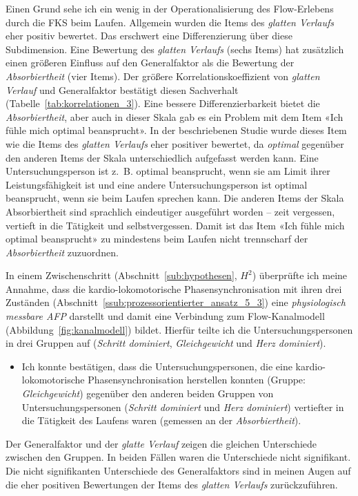 Einen Grund sehe ich ein wenig in der Operationalisierung des Flow-Erlebens durch die \ac{FKS} beim Laufen. Allgemein wurden die Items des \emph{glatten Verlaufs} eher positiv bewertet. Das erschwert eine Differenzierung über diese Subdimension. Eine Bewertung des \emph{glatten Verlaufs} (sechs Items) hat zusätzlich einen größeren Einfluss auf den Generalfaktor als die Bewertung der \emph{Absorbiertheit} (vier Items). Der größere Korrelationskoeffizient von \emph{glatten Verlauf} und Generalfaktor bestätigt diesen Sachverhalt (Tabelle~\ref{tab:korrelationen_3}). Eine bessere Differenzierbarkeit bietet die \emph{Absorbiertheit}, aber auch in dieser Skala gab es ein Problem mit dem Item «Ich fühle mich optimal beansprucht». In der beschriebenen Studie wurde dieses Item wie die Items des \emph{glatten Verlaufs} eher positiver bewertet, da \emph{optimal} gegenüber den anderen Items der Skala unterschiedlich aufgefasst werden kann. Eine Untersuchungsperson ist z.~B. optimal beansprucht, wenn sie am Limit ihrer Leistungsfähigkeit ist und eine andere Untersuchungsperson ist optimal beansprucht, wenn sie beim Laufen sprechen kann. Die anderen Items der Skala Absorbiertheit sind sprachlich eindeutiger ausgeführt worden -- zeit vergessen, vertieft in die Tätigkeit und selbstvergessen. Damit ist das Item «Ich fühle mich optimal beansprucht» zu mindestens beim Laufen nicht trennscharf der \emph{Absorbiertheit} zuzuordnen. 

In einem Zwischenschritt (Abschnitt~\ref{sub:hypothesen}, $H^2$) überprüfte ich meine Annahme, dass die kardio-lokomotorische Phasensynchronisation mit ihren drei Zuständen (Abschnitt~\ref{ssub:prozessorientierter_ansatz_5_3}) eine \emph{physiologisch messbare \ac{AFP}} darstellt und damit eine Verbindung zum Flow-Kanalmodell (Abbildung~\ref{fig:kanalmodell}) bildet. Hierfür teilte ich die Untersuchungspersonen in drei Gruppen auf (\emph{Schritt dominiert}, \emph{Gleichgewicht} und \emph{Herz dominiert}).
\begin{itemize}
	
	\item Ich konnte bestätigen, dass die Untersuchungspersonen, die eine kardio-lokomotorische Phasensynchronisation herstellen konnten (Gruppe: \emph{Gleichgewicht}) gegenüber den anderen beiden Gruppen von Untersuchungspersonen (\emph{Schritt dominiert} und \emph{Herz dominiert}) vertiefter in die Tätigkeit des Laufens waren (gemessen an der \emph{Absorbiertheit}).
\end{itemize}

Der Generalfaktor und der \emph{glatte Verlauf} zeigen die gleichen Unterschiede zwischen den Gruppen. In beiden Fällen waren die Unterschiede nicht signifikant. Die nicht signifikanten Unterschiede des Generalfaktors sind in meinen Augen auf die eher positiven Bewertungen der Items des \emph{glatten Verlaufs} zurückzuführen. 

